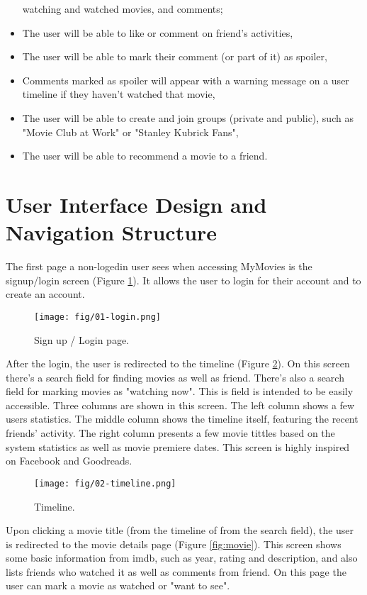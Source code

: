 \begin{itemize}
    watching and watched movies, and comments;
  \item The user will be able to like or comment on friend's activities,
  \item The user will be able to mark their comment (or part of it) as spoiler,
  \item Comments marked as spoiler will appear with a warning message on a user
    timeline if they haven't watched that movie,
  \item The user will be able to create and join groups (private and public),
    such as "Movie Club at Work" or "Stanley Kubrick Fans",
  \item The user will be able to recommend a movie to a friend.
\end{itemize}

\section{User Interface Design and Navigation Structure}

The first page a non-logedin user sees when accessing MyMovies is the
signup/login screen (Figure \ref{fig:login}). It allows the user to login for
their account and to create an account.

\begin{figure}[!htb]
\centering
\texttt{[image: fig/01-login.png]}
\caption{\label{fig:login}Sign up / Login page.}
\end{figure}

After the login, the user is redirected to the timeline (Figure
\ref{fig:timeline}). On this screen there's a search field for finding movies
as well as friend. There's also a search field for marking movies as "watching
now". This is field is intended to be easily accessible. Three columns are
shown in this screen. The left column shows a few users statistics. The middle
column shows the timeline itself, featuring the recent friends' activity. The
right column presents a few movie tittles based on the system statistics as
well as movie premiere dates. This screen is highly inspired on
Facebook\cite{facebook} and Goodreads\cite{goodreads}.

\begin{figure}[!htb]
\centering
\texttt{[image: fig/02-timeline.png]}
\caption{\label{fig:timeline}Timeline.}
\end{figure}

Upon clicking a movie title (from the timeline of from the search field), the
user is redirected to the movie details page (Figure \ref{fig:movie}). This
screen shows some basic information from imdb, such as year, rating and
description, and also lists friends who watched it as well as comments from
friend. On this page the user can mark a movie as watched or "want to see".

